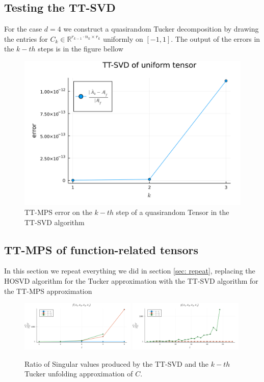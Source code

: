 \documentclass[a4paper]{article}
\begin{document}
\subsection{Testing the TT-SVD}
For the case $d=4$ we construct a quasirandom Tucker decomposition by drawing
the entries for $C_k \in \mathbb{R}^{r_{k-1} \cdot n_k \times r_k}$  uniformly
on $[-1, 1]$. The output of the errors in the $k-th$ steps is in the figure
bellow
\begin{figure}[H]
    \centering
    \includegraphics[width=\textwidth]{"./plots/ttsvd-uniform-error.png"}
    \caption{TT-MPS error on the $k-th$ step of a quasirandom Tensor in the
    TT-SVD algorithm}
\end{figure}
\subsection{TT-MPS of function-related tensors}
In this section we repeat everything we did in section \ref{sec: repeat},
replacing the HOSVD algorithm for the Tucker approximation with the TT-SVD
algorithm for the TT-MPS approximation

\begin{figure}[H]
    \centering
    \includegraphics[width=0.49\textwidth]{./plots/ttsvd-sigmaratio-a.png}
    \includegraphics[width=0.49\textwidth]{./plots/ttsvd-sigmaratio-b.png}
    \caption{Ratio of Singular values produced by the TT-SVD and the $k-th$
    Tucker unfolding approximation of $C$.}
\end{figure}
\end{document}
